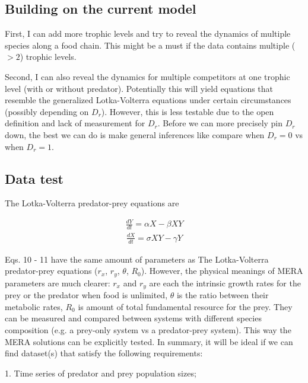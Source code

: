 \documentclass[12pt]{article}
\begin{document}
\subsection{Building on the current model}
First, I can add more trophic levels and try to reveal the dynamics of multiple species along a food chain. This might be a must if the data contains multiple ($>2$) trophic levels.

Second, I can also reveal the dynamics for multiple competitors at one trophic level (with or without predator). Potentially this will yield equations that resemble the generalized Lotka-Volterra equations under certain circumstances (possibly depending on $D_r$). However, this is less testable due to the open definition and lack of measurement for $D_r$. Before we can more precisely pin $D_r$ down, the best we can do is make general inferences like compare when $D_r=0$ vs when $D_r=1$.

\subsection{Data test}

The Lotka-Volterra predator-prey equations are

 \begin{equation}
 \begin{split}
\frac{d Y}{d t} =\alpha X - \beta XY
\end{split}
\end{equation}
 \begin{equation}
 \begin{split}
 \frac{d X}{d t}= \sigma XY - \gamma Y 
\end{split}
\end{equation}

Eqs. 10 - 11 have the same amount of parameters as The Lotka-Volterra predator-prey equations ($r_x$, $r_y$, $\theta$, $R_0$). However, the physical meanings of MERA parameters are much clearer: $r_x$ and $r_y$ are each the intrinsic growth rates for the prey or the predator when food is unlimited, $\theta$ is the ratio between their metabolic rates, $R_0$ is amount of total fundamental resource for the prey. They can be measured and compared between systems with different species composition (e.g. a prey-only system vs a predator-prey system). This way the MERA solutions can be explicitly tested. In summary, it will be ideal if we can find dataset(s) that satisfy the following requirements:

1. Time series of predator and prey population sizes;
\end{document}
